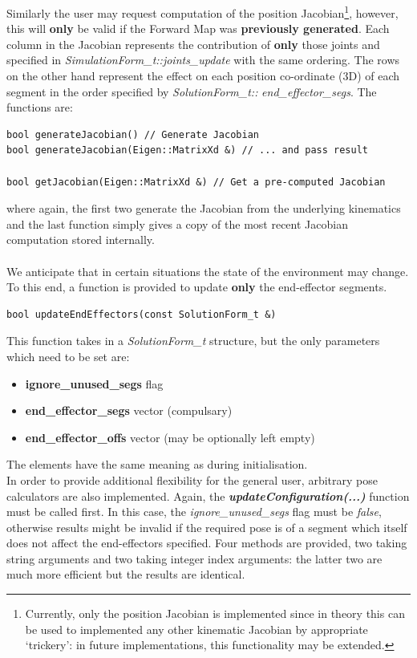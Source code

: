 \documentclass[12pt,a4paper,onecolumn]{article}
\begin{document}
\noindent Similarly the user may request computation of the position Jacobian\footnote{Currently, only the position Jacobian is implemented since in theory this can be used to implemented any other kinematic Jacobian by appropriate `trickery': in future implementations, this functionality may be extended.}, however, this will \textbf{only} be valid if the Forward Map was \textbf{previously generated}. Each column in the Jacobian represents the contribution of \textbf{only} those joints and specified in \textit{SimulationForm\_t::}\textit{joints\_update} with the same ordering. The rows on the other hand represent the effect on each position co-ordinate (3D) of each segment in the order specified by \textit{SolutionForm\_t::} \textit{end\_effector\_segs}. The functions are:

\begin{lstlisting}
bool generateJacobian()	// Generate Jacobian
bool generateJacobian(Eigen::MatrixXd &) // ... and pass result

bool getJacobian(Eigen::MatrixXd &)	// Get a pre-computed Jacobian
\end{lstlisting}

\noindent where again, the first two generate the Jacobian from the underlying kinematics and the last function simply gives a copy of the most recent Jacobian computation stored internally.\\
\\
\noindent We anticipate that in certain situations the state of the environment may change. To this end, a function is provided to update \textbf{only} the end-effector segments.
\begin{lstlisting}
bool updateEndEffectors(const SolutionForm_t &)
\end{lstlisting}
This function takes in a \textit{SolutionForm\_t} structure, but the only parameters which need to be set are:
\begin{itemize}
\item \textbf{ignore\_unused\_segs} flag
\item \textbf{end\_effector\_segs} vector (compulsary)
\item \textbf{end\_effector\_offs} vector (may be optionally left empty)
\end{itemize}
The elements have the same meaning as during initialisation.\\
\newline
\noindent In order to provide additional flexibility for the general user, arbitrary pose calculators are also implemented. Again, the \textbf{\textit{updateConfiguration(...)}} function must be called first. In this case, the \textit{ignore\_unused\_segs} flag must be \textit{false}, otherwise results might be invalid if the required pose is of a segment which itself does not affect the end-effectors specified. Four methods are provided, two taking string arguments and two taking integer index arguments: the latter two are much more efficient but the results are identical.\\
\end{document}

